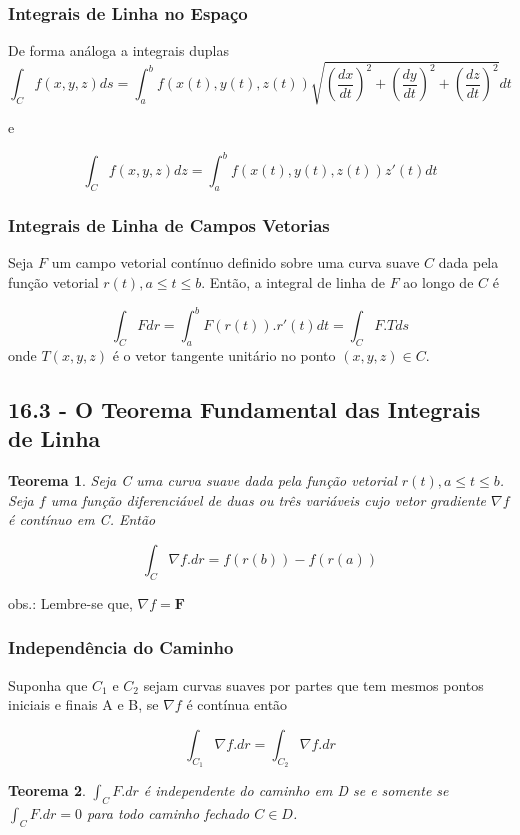 \documentclass[12pt]{article}
\newtheorem{theorem}{Teorema}[section]
\begin{document}
\subsubsection*{Integrais de Linha no Espaço}
De forma análoga a integrais duplas
$$\int_{C} f(x, y, z) ds = \int_{a}^{b} f(x(t), y(t), z(t)) \sqrt{\left(\frac{dx}{dt}\right)^2 + \left(\frac{dy}{dt}\right)^2 + \left(\frac{dz}{dt}\right)^2} dt$$

e

$$\int_{C} f(x, y, z) dz = \int_{a}^{b} f(x(t), y(t), z(t))z'(t)dt$$

\subsubsection*{Integrais de Linha de Campos Vetorias}

Seja $F$ um campo vetorial contínuo definido sobre uma curva suave $C$ dada pela função vetorial $r(t), a \leq t \leq b$. Então, a integral de linha de $F$ ao longo de $C$ é

$$\int_C F dr = \int_{a}^{b} F(r(t)).r'(t) dt = \int_C F . T ds$$
onde $T(x, y, z)$ é o vetor tangente unitário no ponto $(x, y, z) \in C$.

\subsection*{16.3 - O Teorema Fundamental das Integrais de Linha}
\label{s4}

\begin{theorem}
    Seja C uma curva suave dada pela função vetorial $r(t), a \leq t \leq b$. Seja $f$ uma função diferenciável de duas ou três variáveis cujo vetor gradiente $\nabla f$ é contínuo em C. Então

    $$\int_C \nabla f . dr = f(r(b)) - f(r(a))$$
\end{theorem}

obs.: Lembre-se que, $\nabla f = \textbf{F}$

\subsubsection*{Independência do Caminho}

Suponha que $C_1$ e $C_2$ sejam curvas suaves por partes que tem mesmos pontos iniciais e finais A e B, se $\nabla f$ é contínua então

$$\int_{C_1} \nabla f . dr = \int_{C_2} \nabla f . dr$$

\begin{theorem}
    $\int_C F.dr$ é independente do caminho em D se e somente se $\int_C F . dr = 0$ para todo caminho fechado $C \in D$.
\end{theorem}
\end{document}

